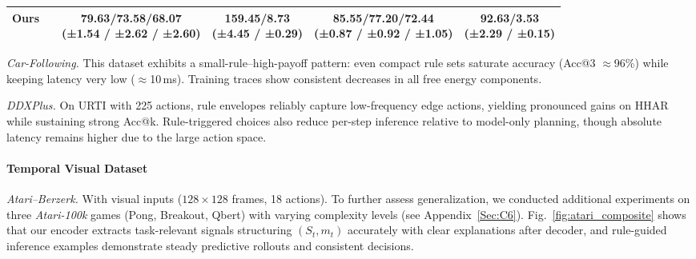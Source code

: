 \documentclass{article} %
\newcommand{\revise}[1]{#1}
\begin{document}
\begin{table}[t]
\begin{tabular}{l l c c c c}
\textbf{Ours} & &
\makecell[c]{\textbf{79.63/73.58/68.07}\\[-3pt]
\revise{{\scriptsize (±1.54 / ±2.62 / ±2.60)}}}
&
\makecell[c]{159.45/8.73\\[-3pt]
\revise{{\scriptsize (±4.45 / ±0.29)}}}
&
\makecell[c]{\textbf{85.55/77.20/72.44}\\[-3pt]
\revise{{\scriptsize (±0.87 / ±0.92 / ±1.05)}}}
&
\makecell[c]{92.63/3.53\\[-3pt]
\revise{{\scriptsize (±2.29 / ±0.15)}}}
\\
\bottomrule
\end{tabular}
\end{table}



\textit{Car-Following.}
This dataset exhibits a small-rule–high-payoff pattern: even compact rule sets saturate accuracy (Acc@3 $\approx$96\%) while keeping latency very low ($\approx$10\,ms). Training traces show consistent decreases in all free energy components. 

\textit{DDXPlus.}
On URTI with 225 actions, rule envelopes reliably capture low-frequency edge actions, yielding pronounced gains on HHAR while sustaining strong Acc@k. Rule-triggered choices also reduce per-step inference relative to model-only planning, though absolute latency remains higher due to the large action space.

\paragraph{Temporal Visual Dataset}

\textit{Atari--Berzerk.}
With visual inputs ($128{\times}128$ frames, 18 actions).
\revise{To further assess generalization, we conducted additional experiments on three \textit{Atari-100k} games (Pong, Breakout, Qbert) with varying complexity levels (see Appendix~\ref{Sec:C6}).}
Fig.~\ref{fig:atari_composite} shows that our encoder extracts task-relevant signals structuring $(S_t,m_t)$ accurately with clear explanations after decoder, and rule-guided inference examples demonstrate steady predictive rollouts and consistent decisions.
\end{document}
